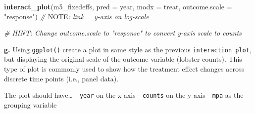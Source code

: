 \documentclass[
]{article}
\newenvironment{Shaded}{\begin{snugshade}}{\end{snugshade}}
\newcommand{\AlertTok}[1]{\textcolor[rgb]{0.94,0.16,0.16}{#1}}
\newcommand{\AttributeTok}[1]{\textcolor[rgb]{0.13,0.29,0.53}{#1}}
\newcommand{\CommentTok}[1]{\textcolor[rgb]{0.56,0.35,0.01}{\textit{#1}}}
\newcommand{\FunctionTok}[1]{\textcolor[rgb]{0.13,0.29,0.53}{\textbf{#1}}}
\newcommand{\NormalTok}[1]{#1}
\newcommand{\StringTok}[1]{\textcolor[rgb]{0.31,0.60,0.02}{#1}}
\begin{document}
\begin{Shaded}
\begin{Highlighting}[]
\FunctionTok{interact\_plot}\NormalTok{(m5\_fixedeffs, }\AttributeTok{pred =}\NormalTok{ year, }\AttributeTok{modx =}\NormalTok{ treat,}
              \AttributeTok{outcome.scale =} \StringTok{"response"}\NormalTok{) }\CommentTok{\# }\AlertTok{NOTE}\CommentTok{: \textquotesingle{}link\textquotesingle{} = y{-}axis on log{-}scale}

\CommentTok{\# HINT: Change \textasciigrave{}outcome.scale\textasciigrave{} to "response" to convert y{-}axis scale to counts}
\end{Highlighting}
\end{Shaded}

\textbf{g.} Using \texttt{ggplot()} create a plot in same style as the
previous \texttt{interaction\ plot}, but displaying the original scale
of the outcome variable (lobster counts). This type of plot is commonly
used to show how the treatment effect changes across discrete time
points (i.e., panel data).

The plot should have\ldots{} - \texttt{year} on the x-axis -
\texttt{counts} on the y-axis - \texttt{mpa} as the grouping variable
\end{document}
